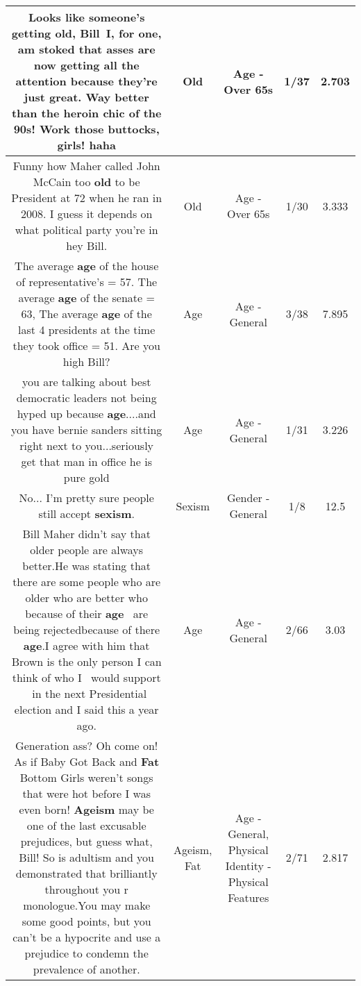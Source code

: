 \documentclass[11pt]{article}
\newlength\mylength
\begin{document}
\begin{center}
\begin{longtable}{|C{.65\mylength}|C{.30\mylength}|C{.12\mylength}|C{.12\mylength}|C{.12\mylength}|}
  \small Looks like someone's getting \textbf{old}, Bill I, for one, am stoked that asses are now getting all the attention because they're just great. Way better than the heroin chic of the 90s! Work those buttocks, girls! haha\normalsize   & Old & Age - Over 65s & 1/37 & 2.703 \\  \hline
  \small Funny how Maher called John McCain too \textbf{old} to be President at 72 when he ran in 2008. I guess it depends on what political party you're in hey Bill.\normalsize   & Old & Age - Over 65s & 1/30 & 3.333 \\  \hline
  \small The average \textbf{age} of the house of representative's = 57. The average \textbf{age} of the senate = 63, The average \textbf{age} of the last 4 presidents at the time they took office = 51. Are you high Bill?\normalsize   & Age & Age - General & 3/38 & 7.895 \\  \hline
  \small you are talking about best democratic leaders not being hyped up because \textbf{age}....and you have bernie sanders sitting right next to you...seriously get that man in office he is pure gold\normalsize   & Age & Age - General & 1/31 & 3.226 \\  \hline
  \small No... I'm pretty sure people still accept \textbf{sexism}.\normalsize   & Sexism & Gender - General & 1/8 & 12.5 \\  \hline
  \small Bill Maher didn't say that older people are always better.He was stating that there are some people who are older who are better who because of their \textbf{age}  are being rejectedbecause of there \textbf{age}.I agree with him that Brown is the only person I can think of who I  would support  in the next Presidential election and I said this a year ago.\normalsize   & Age & Age - General & 2/66 & 3.03 \\  \hline
  \small Generation ass? Oh come on! As if Baby Got Back and \textbf{Fat} Bottom Girls weren't songs that were hot before I was even born! \textbf{Ageism} may be one of the last excusable prejudices, but guess what, Bill! So is adultism and you demonstrated that brilliantly throughout you r monologue.You may make some good points, but you can't be a hypocrite and use a prejudice to condemn the prevalence of another.\normalsize   & Ageism, Fat & Age - General, Physical Identity - Physical Features & 2/71 & 2.817 \\  \hline

\end{longtable}
\end{center}
\end{document}
